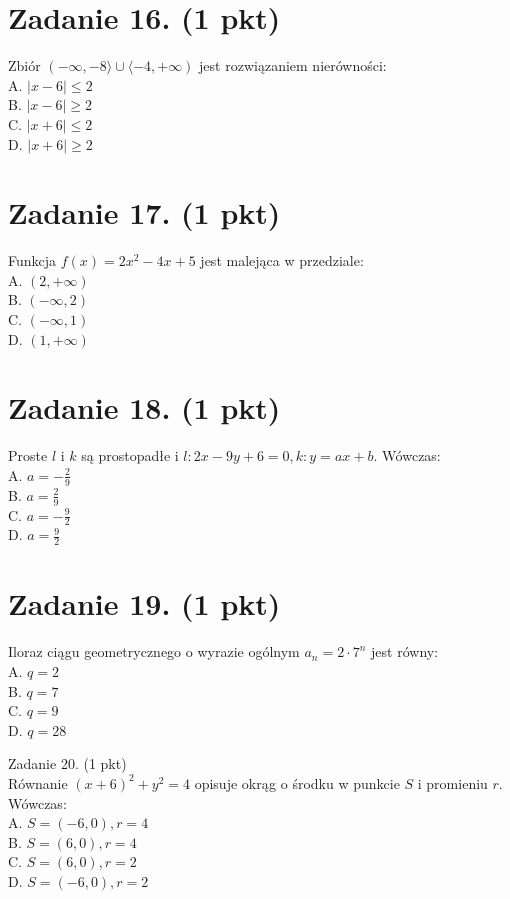 \documentclass[10pt]{article}
\begin{document}
\section*{Zadanie 16. (1 pkt)}
Zbiór \((-\infty,-8\rangle \cup\langle-4,+\infty)\) jest rozwiązaniem nierówności:\\
A. \(|x-6| \leq 2\)\\
B. \(|x-6| \geq 2\)\\
C. \(|x+6| \leq 2\)\\
D. \(|x+6| \geq 2\)

\section*{Zadanie 17. (1 pkt)}
Funkcja \(f(x)=2 x^{2}-4 x+5\) jest malejąca w przedziale:\\
A. \((2,+\infty)\)\\
B. \((-\infty, 2)\)\\
C. \((-\infty, 1)\)\\
D. \((1,+\infty)\)

\section*{Zadanie 18. (1 pkt)}
Proste \(l\) i \(k\) są prostopadłe i \(l: 2 x-9 y+6=0, k: y=a x+b\). Wówczas:\\
A. \(a=-\frac{2}{9}\)\\
B. \(a=\frac{2}{9}\)\\
C. \(a=-\frac{9}{2}\)\\
D. \(a=\frac{9}{2}\)

\section*{Zadanie 19. (1 pkt)}
Iloraz ciągu geometrycznego o wyrazie ogólnym \(a_{n}=2 \cdot 7^{n}\) jest równy:\\
A. \(q=2\)\\
B. \(q=7\)\\
C. \(q=9\)\\
D. \(q=28\)

Zadanie 20. (1 pkt)\\
Równanie \((x+6)^{2}+y^{2}=4\) opisuje okrąg o środku w punkcie \(S\) i promieniu \(r\). Wówczas:\\
A. \(S=(-6,0), r=4\)\\
B. \(S=(6,0), r=4\)\\
C. \(S=(6,0), r=2\)\\
D. \(S=(-6,0), r=2\)
\end{document}
